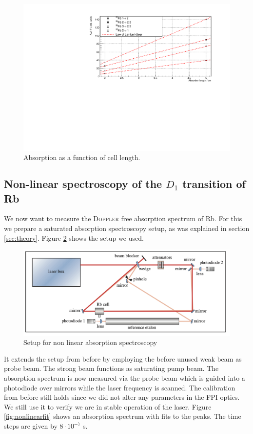 \documentclass[11pt,a4paper,notitlepage]{scrartcl}
\begin{document}
\begin{figure}[H]
	\centering
	
	\includegraphics[width=\linewidth]{figs/measurements/beer.pdf}
	\caption{Absorption as a function of cell length.}
	\label{fig:beer2}
\end{figure}

\subsection{Non-linear spectroscopy of the $D_1$ transition of Rb}
We now want to measure the \textsc{Doppler} free absorption spectrum of Rb. For this we prepare a saturated absorption spectroscopy setup, as was explained in section \ref{sec:theory}. Figure \ref{fig:nonlinear} shows the setup we used. 
\begin{figure}[H]
	\centering
	\includegraphics[width=.9\linewidth]{figs/experimental_setup/setup4.png}
	\caption{Setup for non linear absorption spectroscopy\cite{manual}}
	\label{fig:nonlinear}
\end{figure}
It extends the setup from before by employing the before unused weak beam as probe beam. The strong beam functions as saturating pump beam. The absorption spectrum is now measured via the probe beam which is guided into a photodiode over mirrors while the laser frequency is scanned. The calibration from before still holds since we did not alter any parameters in the FPI optics. We still use it to verify we are in stable operation of the laser. Figure \ref{fig:nonlinearfit} shows an absorption spectrum with fits to the peaks. The time steps are given by $8\cdot10^{-7}$ s.
\end{document}
